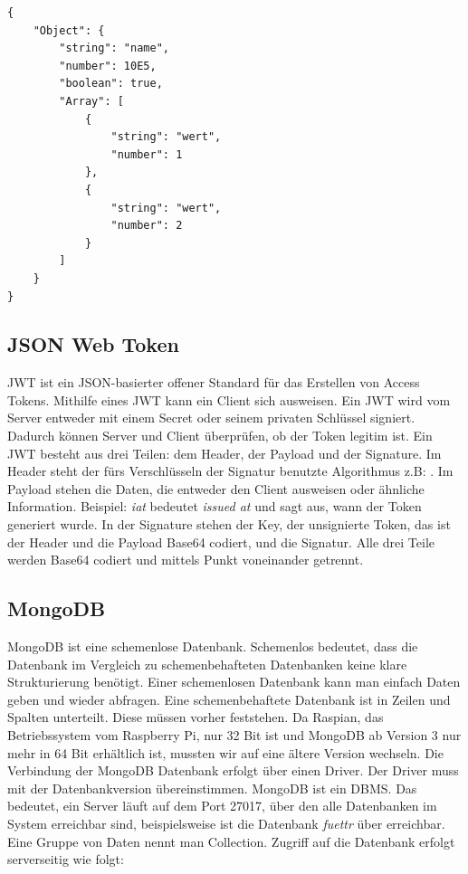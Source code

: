 \begin{lstlisting}[style=JSON,caption=\ac{JSON} Beispiel]
{
	"Object": {	
		"string": "name",
		"number": 10E5,
		"boolean": true,
		"Array": [
			{
				"string": "wert",
				"number": 1
			},
			{
				"string": "wert",
				"number": 2
			}
		]
	}
}
\end{lstlisting}

\subsection{JSON Web Token}
\label{sec:vor-jwt}
\ac{JWT} ist ein JSON-basierter offener Standard für das Erstellen von Access Tokens. Mithilfe eines \ac{JWT} kann ein Client sich ausweisen. Ein \ac{JWT} wird vom Server entweder mit einem Secret oder seinem privaten Schlüssel signiert. Dadurch können Server und Client überprüfen, ob der Token legitim ist. Ein \ac{JWT} besteht aus drei Teilen: dem Header, der Payload und der Signature. Im Header steht der fürs Verschlüsseln der Signatur benutzte Algorithmus z.B: . Im Payload stehen die Daten, die entweder den Client ausweisen oder ähnliche Information. Beispiel:  \textit{iat} bedeutet \textit{issued at} und sagt aus, wann der Token generiert wurde. In der Signature stehen der Key, der unsignierte Token, das ist der Header und die Payload Base64 codiert, und die Signatur. Alle drei Teile werden Base64 codiert und mittels Punkt voneinander getrennt.

\subsection{MongoDB}
\label{sec:vor-mongo}
MongoDB ist eine schemenlose Datenbank. Schemenlos bedeutet, dass die Datenbank im Vergleich zu schemenbehafteten Datenbanken keine klare Strukturierung benötigt. Einer schemenlosen Datenbank kann man einfach Daten geben und wieder abfragen. Eine schemenbehaftete Datenbank ist in Zeilen und Spalten unterteilt. Diese müssen vorher feststehen. Da Raspian, das Betriebssystem vom Raspberry Pi, nur 32 Bit ist und MongoDB ab Version 3 nur mehr in 64 Bit erhältlich ist, mussten wir auf eine ältere Version wechseln. Die Verbindung der MongoDB Datenbank erfolgt über einen Driver. Der Driver muss mit der Datenbankversion übereinstimmen. MongoDB ist ein \ac{DBMS}. Das bedeutet, ein Server läuft auf dem Port 27017, über den alle Datenbanken im System erreichbar sind, beispielsweise ist die Datenbank \textit{fuettr} über  erreichbar. Eine Gruppe von Daten nennt man Collection. Zugriff auf die Datenbank erfolgt serverseitig wie folgt:

